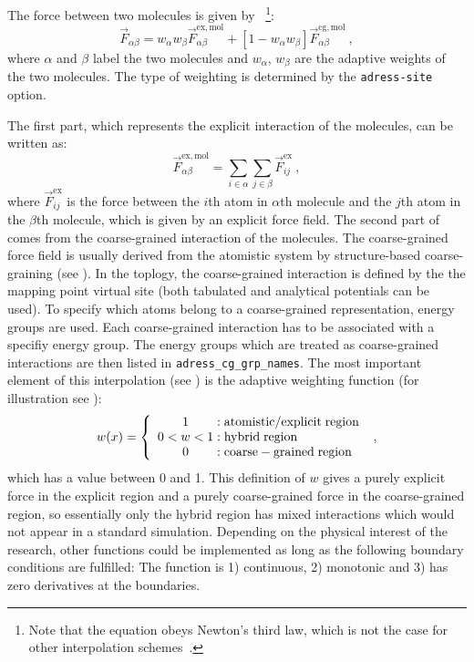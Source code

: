 The force between two molecules is given by~\cite{Praprotnik2005}
\footnote{Note that the equation obeys Newton's third law, which is not the case for other interpolation schemes~\cite{DelleSite2007}.}:
\begin{equation}
\vec{F}_{\alpha\beta}=w_\alpha w_\beta \vec{F}^\mathrm{ex,mol}_{\alpha\beta} + \left[1-w_\alpha w_\beta\right] \vec{F}^\mathrm{cg,mol}_{\alpha\beta}~,
\label{eqn:interpolation}
\end{equation}
where $\alpha$ and $\beta$ label the two molecules and $w_\alpha$, $w_\beta$ are the adaptive weights of the two molecules. The type of weighting is determined by the {\tt adress-site} option.

The first part, which represents the explicit interaction of the molecules, can be written as:
\begin{equation}
\vec{F}^\mathrm{ex,mol}_{\alpha\beta}=\sum_{i\in\alpha}\sum_{j\in\beta} \vec{F}^\mathrm{ex}_{ij}~,
\end{equation}
where $\vec{F}^\mathrm{ex}_{ij}$ is the force between the $i$th atom  in  $\alpha$th molecule and the $j$th atom in the $\beta$th molecule, which is given by an explicit force field.
The second part of  comes from the coarse-grained interaction of the molecules.
The coarse-grained force field is usually derived from the atomistic system by structure-based coarse-graining (see ). In the toplogy, the coarse-grained interaction is defined by the the mapping point virtual site (both tabulated and analytical potentials can be used). To specify which atoms belong to a coarse-grained representation, energy groups are used.
Each coarse-grained interaction has to be associated with a specifiy energy group. The energy groups which are treated as coarse-grained interactions are then listed in {\tt adress_cg_grp_names}.
The most important element of this interpolation (see ) is the adaptive weighting function (for illustration see ):
\begin{equation}
w(x)=
\left\{\begin{array}{c@{\;:\;}l}
1&\mathrm{atomistic/explicit\;region}\\
0<w<1&\mathrm{hybrid\;region}\\
0&\mathrm{coarse-grained\;region}
\end{array}\right.~,
\label{equ:weighting}
\end{equation}
which has a value between 0 and 1.
This definition of $w$ gives a purely explicit force in the explicit region and a purely coarse-grained force in the coarse-grained region,
so essentially  only the hybrid region has mixed interactions which would not appear in a standard simulation.
Depending on the physical interest of the research, other functions could be implemented as long as the following boundary conditions are fulfilled:
The function is 1) continuous, 2) monotonic and 3) has zero derivatives at the boundaries.

